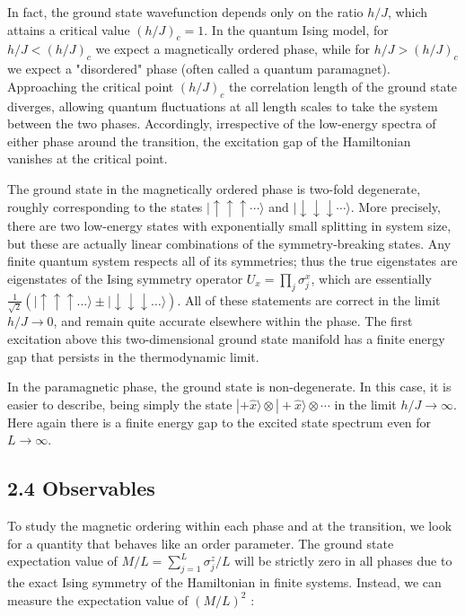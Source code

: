 \documentclass[12pt]{article}
\begin{document}
In fact, the ground state wavefunction depends only on the ratio $h / J$, which attains a critical value $(h / J)_{c}=1$. In the quantum Ising model, for $h / J<(h / J)_{c}$ we expect a magnetically ordered phase, while for $h / J>(h / J)_{c}$ we expect a "disordered" phase (often called a quantum paramagnet). Approaching the critical point $(h / J)_{c}$ the correlation length of the ground state diverges, allowing quantum fluctuations at all length scales to take the system between the two phases. Accordingly, irrespective of the low-energy spectra of either phase around the transition, the excitation gap of the Hamiltonian vanishes at the critical point.

The ground state in the magnetically ordered phase is two-fold degenerate, roughly corresponding to the states $|\uparrow \uparrow \uparrow \cdots\rangle$ and $|\downarrow \downarrow \downarrow \cdots\rangle$. More precisely, there are two low-energy states with exponentially small splitting in system size, but these are actually linear combinations of the symmetry-breaking states. Any finite quantum system respects all of its symmetries; thus the true eigenstates are eigenstates of the Ising symmetry operator $U_{x}=\prod_{j} \sigma_{j}^{x}$, which are essentially $\frac{1}{\sqrt{2}}(|\uparrow \uparrow \uparrow \ldots\rangle \pm|\downarrow \downarrow \downarrow \ldots\rangle)$. All of these statements are correct in the limit $h / J \rightarrow 0$, and remain quite accurate elsewhere within the phase. The first excitation above this two-dimensional ground state manifold has a finite energy gap that persists in the thermodynamic limit.

In the paramagnetic phase, the ground state is non-degenerate. In this case, it is easier to describe, being simply the state $|+\hat{x}\rangle \otimes|+\hat{x}\rangle \otimes \cdots$ in the limit $h / J \rightarrow \infty$. Here again there is a finite energy gap to the excited state spectrum even for $L \rightarrow \infty$.

\subsection*{2.4 Observables}
To study the magnetic ordering within each phase and at the transition, we look for a quantity that behaves like an order parameter. The ground state expectation value of $M / L=\sum_{j=1}^{L} \sigma_{j}^{z} / L$ will be strictly zero in all phases due to the exact Ising symmetry of the Hamiltonian in finite systems. Instead, we can measure the expectation value of $(M / L)^{2}$ :
\end{document}
